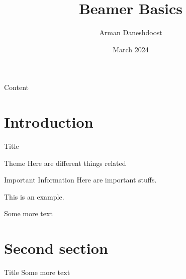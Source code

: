 \documentclass{beamer}
\title{Beamer Basics}
\author{Arman Daneshdoost}
\date{March 2024}
\institute{A University}
\begin{document}
	\maketitle %
	
	\begin{frame}{Content}
		\tableofcontents
	\end{frame}

	\section{Introduction}
	\begin{frame}{Title}
		\begin{block}{Theme}
			Here are different things \alert{related}
		\end{block}\pause
		\begin{alertblock}{Important Information}
			Here are important stuffs.
		\end{alertblock}\pause
		\begin{example}
			This is an example.
		\end{example}\pause
		Some more text
	\end{frame}
	\section{Second section}
	\begin{frame}{Title}
		Some more text
	\end{frame}
\end{document}
